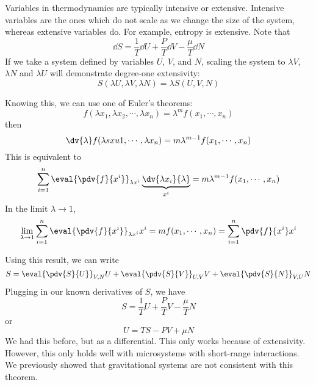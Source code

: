 \documentclass[a4paper,twoside,master.tex]{subfiles}
\begin{document}

Variables in thermodynamics are typically intensive or extensive. Intensive variables are the ones which do not scale as we change the size of the system, whereas extensive variables do. For example, entropy is extensive. Note that
\begin{equation}
    \dd{S} = \frac{1}{T} \dd{U} + \frac{P}{T} \dd{V} - \frac{\mu}{T} \dd{N}
\end{equation}
If we take a system defined by variables $ U $, $ V $, and $ N $, scaling the system to $ \lambda V $, $ \lambda N $ and $ \lambda U $ will demonstrate degree-one extensivity:
\begin{equation}
    S(\lambda U, \lambda V, \lambda N) = \lambda S(U,V,N)
\end{equation}

Knowing this, we can use one of Euler's theorems:
\begin{equation}
    f(\lambda x_1, \lambda x_2, \cdots, \lambda x_n) = \lambda^m f(x_1, \cdots, x_n)
\end{equation}
then
\begin{equation}
    \dv{\lambda} f(\lambda s xu 1, \cdots, \lambda x_n) = m \lambda^{m-1} f(x_1, \cdots, x_n)
\end{equation}
This is equivalent to
\begin{equation}
    \sum_{i=1}^{n} \eval{\pdv{f}{x^i}}_{\lambda x^i} \underbrace{\dv{\lambda x_i}{\lambda}}_{x^i} = m \lambda^{m-1} f(x_1, \cdots, x_n)
\end{equation}
In the limit $ \lambda \to 1 $,
\begin{equation}
    \lim_{\lambda \to 1} \sum_{i=1}^{n} \eval{\pdv{f}{x^i}}_{\lambda x^i} x^i = mf(x_1, \cdots, x_n) = \sum_{i=1}^{n} \pdv{f}{x^i} x^i
\end{equation}

Using this result, we can write
\begin{equation}
    S = \eval{\pdv{S}{U}}_{V,N} U + \eval{\pdv{S}{V}}_{U,V} V + \eval{\pdv{S}{N}}_{V,U} N
\end{equation}
Plugging in our known derivatives of $ S $, we have
\begin{equation}
    S = \frac{1}{T} U + \frac{P}{T} V - \frac{\mu}{T} N
\end{equation}
or
\begin{equation}
    U = TS - PV + \mu N
\end{equation}
We had this before, but as a differential. This only works because of extensivity. However, this only holds well with microsystems with short-range interactions. We previously showed that gravitational systems are not consistent with this theorem.
\end{document}
